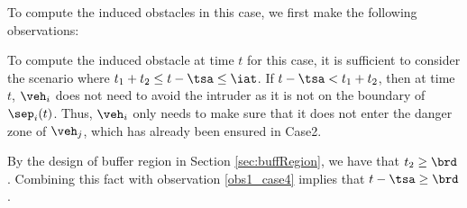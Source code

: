To compute the induced obstacles in this case, we first make the following observations:
\begin{observation} \label{obs1_case4}
To compute the induced obstacle at time $t$ for this case, it is sufficient to consider the scenario where $t_1 + t_2 \leq t - \tsa \leq \iat$. If $t - \tsa < t_1 + t_2$, then at time $t$, $\veh_i$ does not need to avoid the intruder as it is not on the boundary of $\sep_i(t)$. Thus, $\veh_i$ only needs to make sure that it does not enter the danger zone of $\veh_j$, which has already been ensured in Case2. 
\end{observation}
\begin{observation} \label{obs2_case4}
By the design of buffer region in Section \ref{sec:buffRegion}, we have that $t_2 \geq \brd$. Combining this fact with observation \ref{obs1_case4} implies that $t- \tsa \geq \brd$.
\end{observation}


